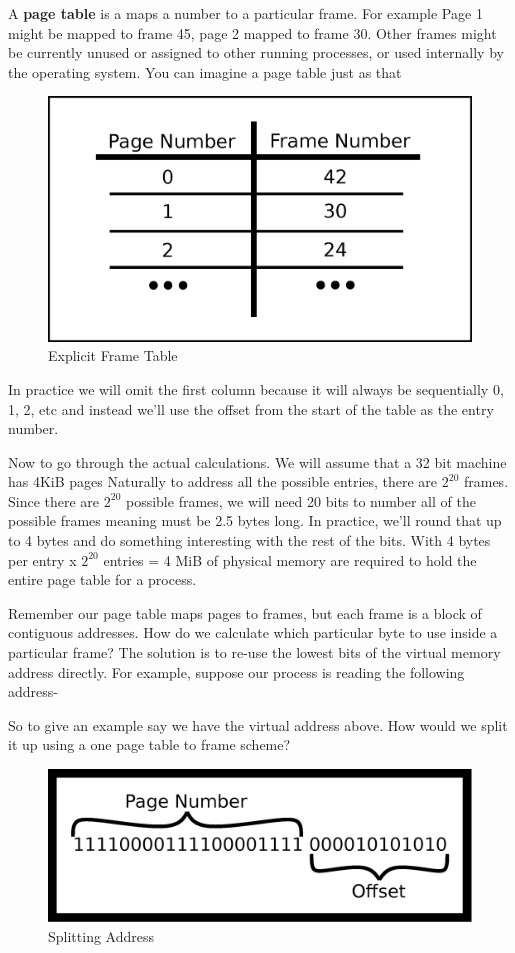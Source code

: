 A \textbf{page table} is a maps a number to a particular frame.
For example Page 1 might be mapped to frame 45, page 2 mapped to frame 30.
Other frames might be currently unused or assigned to other running processes, or used internally by the operating system.
You can imagine a page table just as that

\begin{figure}[H]
  \centering
  \includegraphics[width=.5\textwidth]{ipc/drawings/frame_table.eps}
  \caption{Explicit Frame Table}
\end{figure}

In practice we will omit the first column because it will always be sequentially 0, 1, 2, etc and instead we'll use the offset from the start of the table as the entry number.

Now to go through the actual calculations.
We will assume that a 32 bit machine has 4KiB pages
Naturally to address all the possible entries, there are $2^{20}$ frames.
Since there are $2^{20}$ possible frames, we will need 20 bits to number all of the possible frames meaning  must be 2.5 bytes long.
In practice, we'll round that up to 4 bytes and do something interesting with the rest of the bits.
With 4 bytes per entry x $2^{20}$ entries = 4 MiB of physical memory are required to hold the entire page table for a process.

Remember our page table maps pages to frames, but each frame is a block of contiguous addresses.
How do we calculate which particular byte to use inside a particular frame?
The solution is to re-use the lowest bits of the virtual memory address directly.
For example, suppose our process is reading the following address- 

So to give an example say we have the virtual address above.
How would we split it up using a one page table to frame scheme?

\begin{figure}[H]
\centering
\includegraphics[width=.5\textwidth]{ipc/drawings/address_split.eps}
\caption{Splitting Address}
\end{figure}

